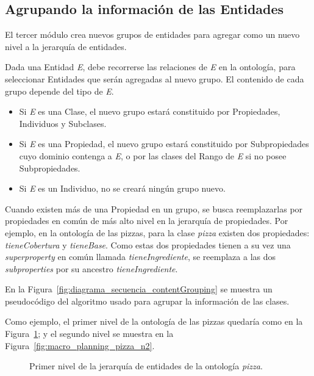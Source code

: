 \subsection{Agrupando la información de las Entidades}
\label{sec:agrupando_info}
El tercer módulo crea nuevos grupos de entidades para agregar como un nuevo nivel a la jerarquía de entidades. 

Dada una Entidad \emph{E}, debe recorrerse las relaciones de \emph{E} en la ontología, para seleccionar Entidades que serán agregadas al nuevo grupo.
El contenido de cada grupo depende del tipo de \emph{E}.
\begin{itemize}
    \item Si \emph{E} es una Clase, el nuevo grupo estará constituido por Propiedades, Individuos y Subclases. 
    \item Si \emph{E} es una Propiedad, el nuevo grupo estará constituido por Subpropiedades cuyo dominio contenga a \emph{E}, o por las clases del Rango de \emph{E} si no posee Subpropiedades.
    \item Si \emph{E} es un Individuo, no se creará ningún grupo nuevo.
\end{itemize}

Cuando existen más de una Propiedad en un grupo, se busca reemplazarlas por propiedades en común de más alto nivel en la jerarquía de propiedades. Por ejemplo, en la ontología de las pizzas, para la clase \emph{pizza} existen dos propiedades: \emph{tieneCobertura} y \emph{tieneBase}. Como estas dos propiedades tienen a su vez una \emph{superproperty} en común llamada \emph{tieneIngrediente}, se reemplaza a las dos \emph{subproperties} por su ancestro \emph{tieneIngrediente}.

En la Figura~\ref{fig:diagrama_secuencia_contentGrouping} se muestra un pseudocódigo del algoritmo usado para agrupar la información de las clases.

Como ejemplo, el primer nivel de la ontología de las pizzas quedaría como en la Figura~\ref{fig:macro_planning_pizza}; y el segundo nivel se muestra en la Figura~\ref{fig:macro_planning_pizza_n2}. 

\begin{figure}
\centering
\begin{minipage}[c]{0.7\textwidth}
{\footnotesize 
{}}
\caption{Primer nivel de la jerarquía de entidades de la ontología \emph{pizza}.}
\label{fig:macro_planning_pizza}
\end{minipage}
\end{figure}

